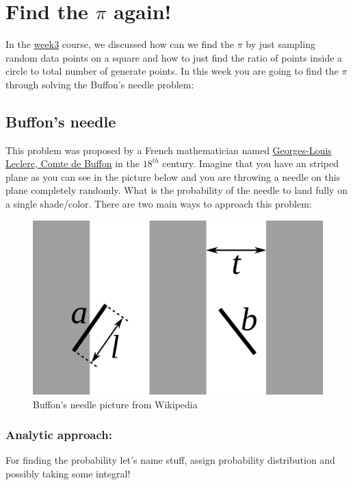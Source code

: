 \documentclass[12pt,letterpaper]{article}
\begin{document}
\section*{Find the $\pi$ again!}
In the \href{https://abtinshahidi.github.io/teaching/2019-spring-foundation-machine-learning/week3}{week3} course, we discussed how can we find the $\pi$ by just sampling random data points on a square and how to just find the ratio of points inside a circle to total number of generate points. In this week you are going to find the $\pi$ through solving the Buffon's needle problem:

\subsection*{Buffon's needle}
This problem was proposed by a French mathematician named \href{https://en.wikipedia.org/wiki/Georges-Louis_Leclerc,_Comte_de_Buffon}{Georges-Louis Leclerc, Comte de Buffon} in the $18^{th}$ century. Imagine that you have an striped plane as you can see in the picture below and you are throwing a needle on this plane completely randomly. What is the probability of the needle to land fully on a single shade/color. There are two main ways to approach this problem:

\begin{figure}[ht]
\begin{center}
\includegraphics[scale=0.1]{buffon.png}
\end{center}
\caption{Buffon's needle picture from Wikipedia}
\end{figure}

\subsubsection*{Analytic approach:}
For finding the probability let's name stuff, assign probability distribution and possibly taking some integral!
\end{document}
